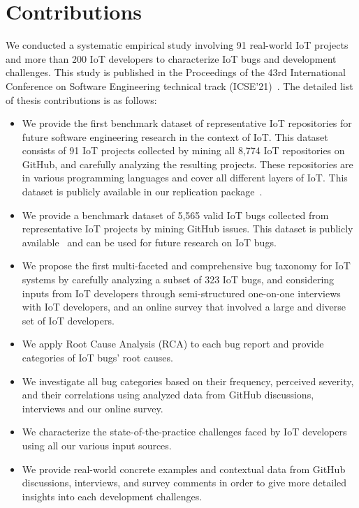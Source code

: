 \section{Contributions  }
We conducted a systematic empirical study involving 91 real-world IoT projects and more than 200 IoT developers to characterize IoT bugs and development challenges. This study is published in the Proceedings of the 43rd International Conference on Software Engineering technical track (ICSE'21)~\cite{makhshari2021iot}. The detailed list of thesis contributions is as follows:
\begin{itemize}
\item {We provide the first benchmark dataset of representative IoT repositories for future software engineering research in the context of IoT. This dataset consists of 91 IoT projects collected by mining all 8,774 IoT repositories on GitHub, and carefully analyzing the resulting projects. These repositories are in various programming languages and cover all different layers of IoT. This dataset is publicly available in our replication package~\cite{repPack}}.
\item {We provide a benchmark dataset of 5,565 valid IoT bugs collected from representative IoT projects by mining GitHub issues. This dataset is publicly available~\cite{repPack} and can be used for future research on IoT bugs.}
\item {We propose the first multi-faceted and comprehensive bug taxonomy for IoT systems by carefully analyzing a subset of 323 IoT bugs, and considering inputs from IoT developers through semi-structured one-on-one interviews with IoT developers, and an online survey that involved a large and diverse set of IoT developers.}
\item {We apply Root Cause Analysis (RCA) to each bug report and provide categories of IoT bugs' root causes.}
\item{We investigate all bug categories based on their frequency, perceived severity, and their correlations using analyzed data from GitHub discussions, interviews and our online survey.}
\item {We characterize the state-of-the-practice challenges faced by IoT developers using all our various input sources.} 
\item{We provide real-world concrete examples and contextual data from GitHub discussions, interviews, and survey comments in order to give more detailed insights into each development challenges.}
\end{itemize}


